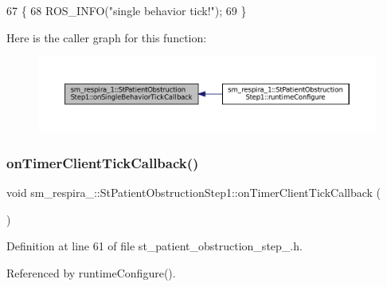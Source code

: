 \begin{DoxyCode}
67     \{
68         ROS\_INFO(\textcolor{stringliteral}{"single behavior tick!"});
69     \}
\end{DoxyCode}
Here is the caller graph for this function\+:
\nopagebreak
\begin{figure}[H]
\begin{center}
\leavevmode
\includegraphics[width=350pt]{structsm__respira__1_1_1StPatientObstructionStep1_a87a086647c2ec7b38f86f17d2719c89b_icgraph}
\end{center}
\end{figure}
\mbox{\label{structsm__respira__1_1_1StPatientObstructionStep1_a330f5d86b827dedd1ca72d7356215c49}} 
\subsubsection{\texorpdfstring{on\+Timer\+Client\+Tick\+Callback()}{onTimerClientTickCallback()}}
{\footnotesize\ttfamily void sm\+\_\+respira\+\_\+::\+St\+Patient\+Obstruction\+Step1\+::on\+Timer\+Client\+Tick\+Callback (\begin{DoxyParamCaption}{ }\end{DoxyParamCaption})\hspace{0.3cm}{\ttfamily [inline]}}



Definition at line 61 of file st\+\_\+patient\+\_\+obstruction\+\_\+step\+\_.\+h.



Referenced by runtime\+Configure().


